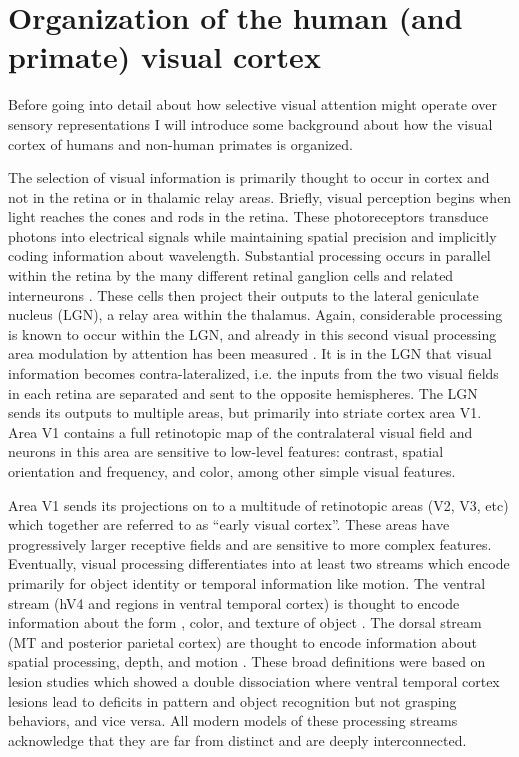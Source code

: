 \section{Organization of the human (and primate) visual cortex}

Before going into detail about how selective visual attention might operate over sensory representations I will introduce some background about how the visual cortex of humans and non-human primates is organized. 

The selection of visual information is primarily thought to occur in cortex and not in the retina or in thalamic relay areas. Briefly, visual perception begins when light reaches the cones and rods in the retina. These photoreceptors transduce photons into electrical signals while maintaining spatial precision and implicitly coding information about wavelength. Substantial processing occurs in parallel within the retina by the many different retinal ganglion cells and related interneurons \citep{Field2007-iv}. These cells then project their outputs to the lateral geniculate nucleus (LGN), a relay area within the thalamus. Again, considerable processing is known to occur within the LGN, and already in this second visual processing area modulation by attention has been measured \citep{OConnor2002-mx}. It is in the LGN that visual information becomes contra-lateralized, i.e. the inputs from the two visual fields in each retina are separated and sent to the opposite hemispheres. The LGN sends its outputs to multiple areas, but primarily into striate cortex area V1. Area V1 contains a full retinotopic map of the contralateral visual field and neurons in this area are sensitive to low-level features: contrast, spatial orientation and frequency, and color, among other simple visual features.

Area V1 sends its projections on to a multitude of retinotopic areas (V2, V3, etc) which together are referred to as ``early visual cortex''. These areas have progressively larger receptive fields \citep{Dumoulin2008-uc} and are sensitive to more complex features. Eventually, visual processing differentiates into at least two streams \citep{Mishkin1983-ys} which encode primarily for object identity or temporal information like motion. The ventral stream (hV4 and regions in ventral temporal cortex) is thought to encode information about the form \citep{Desimone1987-sq}, color, and texture of object \citep{Okazawa2015-mn}. The dorsal stream (MT and posterior parietal cortex) are thought to encode information about spatial processing, depth, and motion \citep{Britten1993-oh}. These broad definitions were based on lesion studies which showed a double dissociation where ventral temporal cortex lesions lead to deficits in pattern and object recognition but not grasping behaviors, and vice versa. All modern models of these processing streams acknowledge that they are far from distinct and are deeply interconnected.

